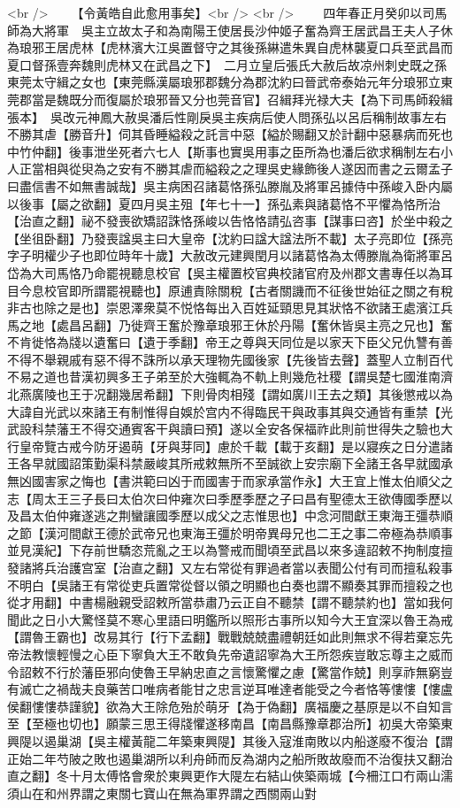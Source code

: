 <br />
　　【令黃皓自此愈用事矣】<br />
<br />
　　四年春正月癸卯以司馬師為大將軍　吳主立故太子和為南陽王使居長沙仲姬子奮為齊王居武昌王夫人子休為琅邪王居虎林【虎林濱大江吳置督守之其後孫綝遣朱異自虎林襲夏口兵至武昌而夏口督孫壹奔魏則虎林又在武昌之下】　二月立皇后張氏大赦后故凉州刺史既之孫東莞太守緝之女也【東莞縣漢屬琅邪郡魏分為郡沈約曰晉武帝泰始元年分琅邪立東莞郡當是魏既分而復屬於琅邪晉又分也莞音官】召緝拜光禄大夫【為下司馬師殺緝張本】　吳改元神鳳大赦吳潘后性剛戾吳主疾病后使人問孫弘以呂后稱制故事左右不勝其虐【勝音升】伺其昏睡縊殺之託言中惡【縊於賜翻又於計翻中惡暴病而死也中竹仲翻】後事泄坐死者六七人【斯事也實吳用事之臣所為也潘后欲求稱制左右小人正當相與從臾為之安有不勝其虐而縊殺之之理吳史緣飾後人遂因而書之云爾孟子曰盡信書不如無書誠哉】吳主病困召諸葛恪孫弘滕胤及將軍呂據侍中孫峻入卧内屬以後事【屬之欲翻】夏四月吳主殂【年七十一】孫弘素與諸葛恪不平懼為恪所治【治直之翻】祕不發喪欲矯詔誅恪孫峻以告恪恪請弘咨事【謀事曰咨】於坐中殺之【坐徂卧翻】乃發喪諡吳主曰大皇帝【沈約曰諡大諡法所不載】太子亮即位【孫亮字子明權少子也即位時年十歲】大赦改元建興閏月以諸葛恪為太傅滕胤為衛將軍呂岱為大司馬恪乃命罷視聽息校官【吳主權置校官典校諸官府及州郡文書專任以為耳目今息校官即所謂罷視聽也】原逋責除關稅【古者關譏而不征後世始征之關之有稅非古也除之是也】崇恩澤衆莫不悦恪每出入百姓延頸思見其狀恪不欲諸王處濱江兵馬之地【處昌呂翻】乃徙齊王奮於豫章琅邪王休於丹陽【奮休皆吳主亮之兄也】奮不肯徙恪為牋以遺奮曰【遺于季翻】帝王之尊與天同位是以家天下臣父兄仇讐有善不得不舉親戚有惡不得不誅所以承天理物先國後家【先後皆去聲】蓋聖人立制百代不易之道也昔漢初興多王子弟至於大強輒為不軌上則幾危社稷【謂吳楚七國淮南濟北燕廣陵也王于况翻幾居希翻】下則骨肉相殘【謂如廣川王去之類】其後懲戒以為大諱自光武以來諸王有制惟得自娛於宫内不得臨民干與政事其與交通皆有重禁【光武設科禁藩王不得交通賓客干與讀曰預】遂以全安各保福祚此則前世得失之驗也大行皇帝覽古戒今防牙遏萌【牙與芽同】慮於千載【載于亥翻】是以寢疾之日分遣諸王各早就國詔策勤渠科禁嚴峻其所戒敕無所不至誠欲上安宗廟下全諸王各早就國承無凶國害家之悔也【書洪範曰凶于而國害于而家承當作永】大王宜上惟太伯順父之志【周太王三子長曰太伯次曰仲雍次曰季歷季歷之子曰昌有聖德太王欲傳國季歷以及昌太伯仲雍遂逃之荆蠻讓國季歷以成父之志惟思也】中念河間獻王東海王彊恭順之節【漢河間獻王德於武帝兄也東海王彊於明帝異母兄也二王之事二帝極為恭順事並見漢紀】下存前世驕恣荒亂之王以為警戒而聞頃至武昌以來多違詔敕不拘制度擅發諸將兵治護宫室【治直之翻】又左右常從有罪過者當以表聞公付有司而擅私殺事不明白【吳諸王有常從吏兵置常從督以領之明顯也白奏也謂不顯奏其罪而擅殺之也從才用翻】中書楊融親受詔敕所當恭肅乃云正自不聽禁【謂不聽禁約也】當如我何聞此之日小大驚怪莫不寒心里語曰明鑑所以照形古事所以知今大王宜深以魯王為戒【謂魯王霸也】改易其行【行下孟翻】戰戰兢兢盡禮朝廷如此則無求不得若棄忘先帝法教懷輕慢之心臣下寧負大王不敢負先帝遺詔寧為大王所怨疾豈敢忘尊主之威而令詔敕不行於藩臣邪向使魯王早納忠直之言懷驚懼之慮【驚當作兢】則享祚無窮豈有滅亡之禍哉夫良藥苦口唯病者能甘之忠言逆耳唯達者能受之今者恪等慺慺【慺盧侯翻慺慺恭謹貌】欲為大王除危殆於萌牙【為于偽翻】廣福慶之基原是以不自知言至【至極也切也】願蒙三思王得牋懼遂移南昌【南昌縣豫章郡治所】初吳大帝築東興隄以遏巢湖【吳主權黃龍二年築東興隄】其後入寇淮南敗以内船遂廢不復治【謂正始二年芍陂之敗也遏巢湖所以利舟師而反為湖内之船所敗故廢而不治復扶又翻治直之翻】冬十月太傅恪會衆於東興更作大隄左右結山俠築兩城【今柵江口冇兩山濡須山在和州界謂之東關七寶山在無為軍界謂之西關兩山對